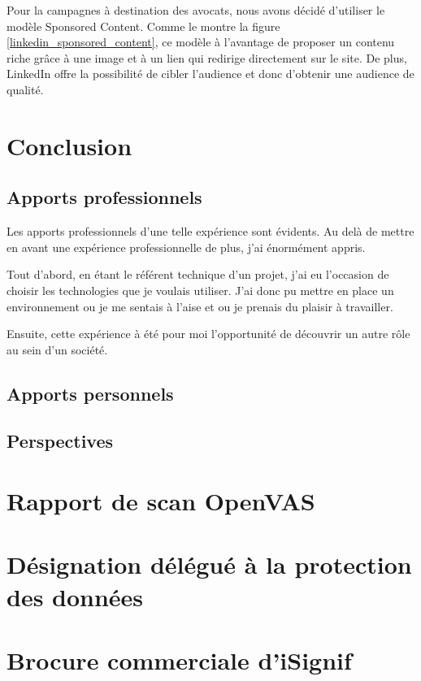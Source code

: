 \documentclass[]{report}
\begin{document}
      Pour la campagnes à destination des avocats, nous avons décidé d’utiliser le modèle Sponsored Content. Comme le montre la figure \ref{linkedin_sponsored_content}, ce modèle à l'avantage de proposer un contenu riche grâce à une image et à un lien qui redirige directement sur le site. De plus, LinkedIn offre la possibilité de cibler l'audience et donc d'obtenir une audience de qualité.


\chapter{Conclusion}

  \section{Apports professionnels}

    Les apports professionnels d'une telle expérience sont évidents. Au delà de mettre en avant une expérience professionnelle de plus, j'ai énormément appris.

    Tout d'abord, en étant le référent technique d'un projet, j'ai eu l'occasion de choisir les technologies que je voulais utiliser. J'ai donc pu mettre en place un environnement ou je me sentais à l'aise et ou je prenais du plaisir à travailler.

    Ensuite, cette expérience à été pour moi l'opportunité de découvrir un autre rôle au sein d'un société.


  \section{Apports personnels}


  \section{Perspectives}



\begin{appendix}
    \chapter{Rapport de scan OpenVAS}\label{apx:openvas_report}
    

    \chapter{Désignation délégué
à la protection des données}\label{apx:dpo}
    

    \chapter{Brocure commerciale d'iSignif}\label{apx:brochure}
    
\end{appendix}
\end{document}
